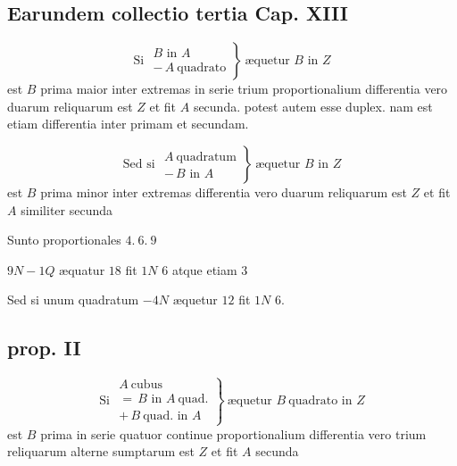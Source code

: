 \documentclass[11pt,a4paper]{article}
\begin{document}
\subsection*{Earundem collectio tertia Cap. XIII}

\[ \text{Si } \left.\begin{array}{l} B \text{ in } A \\ -\,A\ \text{quadrato} \end{array}\right\}\ \text{æquetur } B \text{ in } Z \]
est $B$ prima maior inter extremas in serie trium proportionalium differentia vero duarum reliquarum est $Z$ et fit $A$ secunda. potest autem esse duplex. nam est etiam differentia inter primam et secundam.

\[ \text{Sed si } \left.\begin{array}{l} A\ \text{quadratum} \\ -\,B \text{ in } A \end{array}\right\}\ \text{æquetur } B \text{ in } Z \]
est $B$ prima minor inter extremas differentia vero duarum reliquarum est $Z$ et fit $A$ similiter secunda

Sunto proportionales $4.\ 6.\ 9$

$9N - 1Q$ æquatur $18$ fit $1N$ $6$ atque etiam $3$

Sed si unum quadratum $- 4N$ æquetur $12$ fit $1N$ $6$.

\subsection*{prop. II}

\[ \text{Si } \left.\begin{array}{l} A\ \text{cubus} \\ =\,B \text{ in } A\ \text{quad.} \\ +\,B\ \text{quad. in } A \end{array}\right\}\ \text{æquetur } B\ \text{quadrato in } Z \]
\marginal{$-$}
est $B$ prima in serie quatuor continue proportionalium differentia vero trium reliquarum alterne sumptarum est $Z$ et fit $A$ secunda
\end{document}
